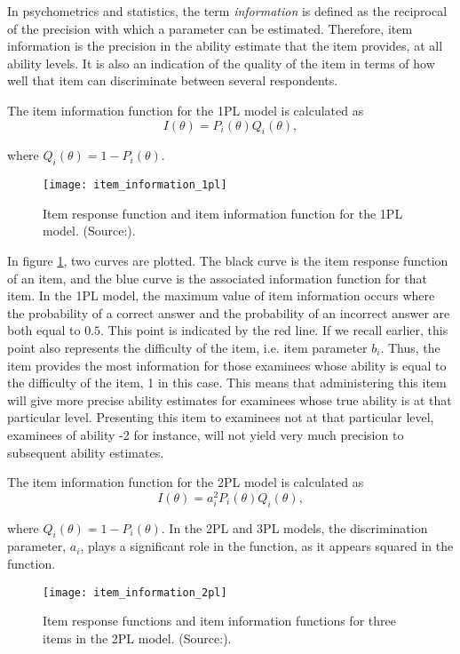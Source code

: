 In psychometrics and statistics, the term \textit{information} is defined as the reciprocal of the precision with which a parameter can be estimated\cite{Basics-IRT}. Therefore, item information is the precision in the ability estimate that the item provides, at all ability levels. It is also an indication of the quality of the item in terms of how well that item can discriminate between several respondents. \newline

The item information function for the 1PL model is calculated as
$$I(\theta) = P_i(\theta)Q_i(\theta),$$

where $Q_i(\theta) = 1-P_i(\theta)$.

\begin{figure}[H]
\centering
\texttt{[image: item\_information\_1pl]}
\caption{Item response function and item information
function for the 1PL model. (Source:\cite{Visual-IRT}).}
\label{fig:item_information_1pl}
\end{figure}

In figure \ref{fig:item_information_1pl}, two curves are plotted. The black curve is the item response function of an item, and the blue curve is the associated information function for that item. In the 1PL model, the maximum value of item information occurs where the probability of a correct answer and the probability of an incorrect answer are both equal to $0.5$. This point is indicated by the red line. If we recall earlier, this point also represents the difficulty of the item, i.e. item parameter $b_i$. Thus, the item provides the most information for those examinees whose ability is equal to the difficulty of the item, 1 in this case. This means that administering this item will give more precise ability estimates for examinees whose true ability is at that particular level. Presenting this item to examinees not at that particular level, examinees of ability -2 for instance, will not yield very much precision to subsequent ability estimates. \newline

The item information function for the 2PL model is calculated as
$$I(\theta) = a_i^2 P_i(\theta)Q_i(\theta),$$

where $Q_i(\theta) = 1-P_i(\theta)$. In the 2PL and 3PL models, the discrimination parameter, $a_i$, plays a significant role in the function, as it appears squared in the function.

\begin{figure}[H]
\centering
\texttt{[image: item\_information\_2pl]}
\caption{Item response functions and item information
functions for three items in the 2PL model. (Source:\cite{Visual-IRT}).}
\label{fig:item_information_2pl}
\end{figure}

